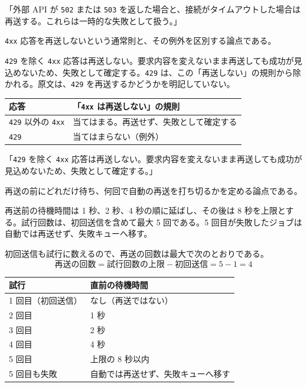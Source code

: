 \documentclass[10pt]{article}
\begin{document}
\begin{genbun}
「外部 API が \texttt{502} または \texttt{503} を返した場合と、接続がタイムアウトした場合は再送する。これらは一時的な失敗として扱う。」
\end{genbun}

\texttt{4xx} 応答を再送しないという通常則と、その例外を区別する論点である。

\begin{youten}
\texttt{429} を除く \texttt{4xx} 応答は再送しない。要求内容を変えないまま再送しても成功が見込めないため、失敗として確定する。\texttt{429} は、この「再送しない」の規則から除かれる。原文は、\texttt{429} を再送するかどうかを明記していない。
\end{youten}

\begin{tabular}{lL{0.56}}
\toprule
応答 & 「\texttt{4xx} は再送しない」の規則 \\
\midrule
\texttt{429} 以外の \texttt{4xx} & 当てはまる。再送せず、失敗として確定する \\
\texttt{429} & 当てはまらない（例外） \\
\bottomrule
\end{tabular}

\begin{genbun}
「\texttt{429} を除く \texttt{4xx} 応答は再送しない。要求内容を変えないまま再送しても成功が見込めないため、失敗として確定する。」
\end{genbun}

再送の前にどれだけ待ち、何回で自動の再送を打ち切るかを定める論点である。

\begin{youten}
再送前の待機時間は 1 秒、2 秒、4 秒の順に延ばし、その後は 8 秒を上限とする。試行回数は、初回送信を含めて最大 5 回である。5 回目が失敗したジョブは自動では再送せず、失敗キューへ移す。

初回送信も試行に数えるので、再送の回数は最大で次のとおりである。
\begin{equation}
  \text{再送の回数} = \text{試行回数の上限} - \text{初回送信} = 5 - 1 = 4
\end{equation}
\end{youten}

\begin{tabular}{lL{0.56}}
\toprule
試行 & 直前の待機時間 \\
 回目（初回送信） & なし（再送ではない） \\
2 回目 & 1 秒 \\
3 回目 & 2 秒 \\
4 回目 & 4 秒 \\
5 回目 & 上限の 8 秒以内 \\
5 回目も失敗 & 自動では再送せず、失敗キューへ移す \\
\bottomrule
\end{tabular}
\end{document}
